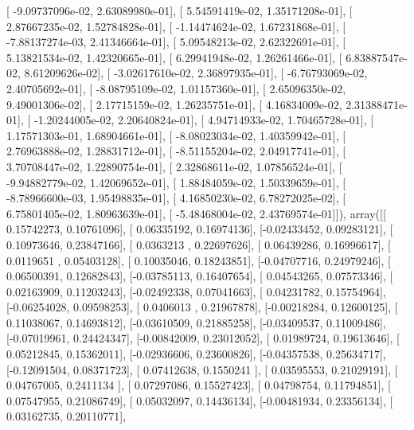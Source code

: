 \documentclass{article}
\begin{document}
       [ -9.09737096e-02,   2.63089980e-01],
       [  5.54591419e-02,   1.35171208e-01],
       [  2.87667235e-02,   1.52784828e-01],
       [ -1.14474624e-02,   1.67231868e-01],
       [ -7.88137274e-03,   2.41346664e-01],
       [  5.09548213e-02,   2.62322691e-01],
       [  5.13821534e-02,   1.42320665e-01],
       [  6.29941948e-02,   1.26261466e-01],
       [  6.83887547e-02,   8.61209626e-02],
       [ -3.02617610e-02,   2.36897935e-01],
       [ -6.76793069e-02,   2.40705692e-01],
       [ -8.08795109e-02,   1.01157360e-01],
       [  2.65096350e-02,   9.49001306e-02],
       [  2.17715159e-02,   1.26235751e-01],
       [  4.16834009e-02,   2.31388471e-01],
       [ -1.20244005e-02,   2.20640824e-01],
       [  4.94714933e-02,   1.70465728e-01],
       [  1.17571303e-01,   1.68904661e-01],
       [ -8.08023034e-02,   1.40359942e-01],
       [  2.76963888e-02,   1.28831712e-01],
       [ -8.51155204e-02,   2.04917741e-01],
       [  3.70708447e-02,   1.22890754e-01],
       [  2.32868611e-02,   1.07856524e-01],
       [ -9.94882779e-02,   1.42069652e-01],
       [  1.88484059e-02,   1.50339659e-01],
       [ -8.78966600e-03,   1.95498835e-01],
       [  4.16850230e-02,   6.78272025e-02],
       [  6.75801405e-02,   1.80963639e-01],
       [ -5.48468004e-02,   2.43769574e-01]]), array([[ 0.15742273,  0.10761096],
       [ 0.06335192,  0.16974136],
       [-0.02433452,  0.09283121],
       [ 0.10973646,  0.23847166],
       [ 0.0363213 ,  0.22697626],
       [ 0.06439286,  0.16996617],
       [ 0.0119651 ,  0.05403128],
       [ 0.10035046,  0.18243851],
       [-0.04707716,  0.24979246],
       [ 0.06500391,  0.12682843],
       [-0.03785113,  0.16407654],
       [ 0.04543265,  0.07573346],
       [ 0.02163909,  0.11203243],
       [-0.02492338,  0.07041663],
       [ 0.04231782,  0.15754964],
       [-0.06254028,  0.09598253],
       [ 0.0406013 ,  0.21967878],
       [-0.00218284,  0.12600125],
       [ 0.11038067,  0.14693812],
       [-0.03610509,  0.21885258],
       [-0.03409537,  0.11009486],
       [-0.07019961,  0.24424347],
       [-0.00842009,  0.23012052],
       [ 0.01989724,  0.19613646],
       [ 0.05212845,  0.15362011],
       [-0.02936606,  0.23600826],
       [-0.04357538,  0.25634717],
       [-0.12091504,  0.08371723],
       [ 0.07412638,  0.1550241 ],
       [ 0.03595553,  0.21029191],
       [ 0.04767005,  0.2411134 ],
       [ 0.07297086,  0.15527423],
       [ 0.04798754,  0.11794851],
       [ 0.07547955,  0.21086749],
       [ 0.05032097,  0.14436134],
       [-0.00481934,  0.23356134],
       [ 0.03162735,  0.20110771],
\end{document}

